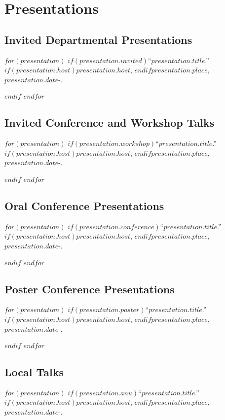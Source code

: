 \documentclass[11pt]{article}
\def\printdate#1{\xprintdate#1-}
\def\xprintdate#1-#2-#3-{#1}
\begin{document}
\section{Presentations}

\subsection{Invited Departmental Presentations}

$for(presentation)$
$if(presentation.invited)$\ind ``$presentation.title$.'' $if(presentation.host)$$presentation.host$, $endif$$presentation.place$, \printdate{$presentation.date$}.

$endif$
$endfor$

\subsection{Invited Conference and Workshop Talks}

$for(presentation)$
$if(presentation.workshop)$\ind ``$presentation.title$.'' $if(presentation.host)$\emph{$presentation.host$}, $endif$$presentation.place$, \printdate{$presentation.date$}.

$endif$
$endfor$

\subsection{Oral Conference Presentations}

$for(presentation)$
$if(presentation.conference)$\ind ``$presentation.title$.'' $if(presentation.host)$\emph{$presentation.host$}, $endif$$presentation.place$, \printdate{$presentation.date$}.

$endif$
$endfor$

\subsection{Poster Conference Presentations}

$for(presentation)$
$if(presentation.poster)$\ind ``$presentation.title$.'' $if(presentation.host)$\emph{$presentation.host$}, $endif$$presentation.place$, \printdate{$presentation.date$}.

$endif$
$endfor$

\subsection{Local Talks}

$for(presentation)$
$if(presentation.anu)$\ind ``$presentation.title$.'' $if(presentation.host)$\emph{$presentation.host$}, $endif$$presentation.place$, \printdate{$presentation.date$}.
\end{document}
